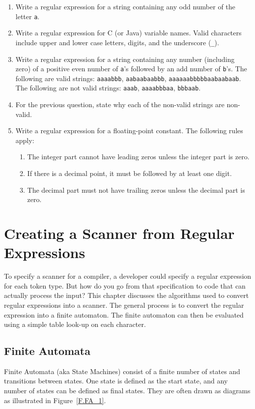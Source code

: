\documentclass[letterpaper,12pt,openany,reqno]{book}%
\begin{document}
\begin{enumerate}
\item Write a regular expression for a string containing any odd number of the letter \texttt{a}.
\item Write a regular expression for C (or Java) variable names. Valid characters include upper and lower case letters, digits, and the underscore (\texttt{\_}).
\item Write a regular expression for a string containing any number (including zero) of a positive even number of \texttt{a}'s followed by an add number of \texttt{b}'s. The following are valid strings: \texttt{aaaabbb}, \texttt{aabaabaabbb}, \texttt{aaaaaabbbbbaabaabaab}. The following are not valid strings: \texttt{aaab}, \texttt{aaaabbbaa}, \texttt{bbbaab}.
\item For the previous question, state why each of the non-valid strings are non-valid.
\item Write a regular expression for a floating-point constant. The following rules apply: 
\begin{enumerate}
\item The integer part cannot have leading zeros unless the integer part is zero. 
\item If there is a decimal point, it must be followed by at least one digit.
\item The decimal part must not have trailing zeros unless the decimal part is zero.
\end{enumerate}
\end{enumerate}

\chapter{Creating a Scanner from Regular Expressions}

To specify a scanner for a compiler, a developer could specify a regular expression for each token type. But how do you go from that specification to code that can actually process the input? This chapter discusses the algorithms used to convert regular expressions into a scanner. The general process is to convert the regular expression into a finite automaton. The finite automaton can then be evaluated using a simple table look-up on each character.

\section{Finite Automata}
Finite Automata (aka State Machines) consist of a finite number of states and transitions between states. One state is defined as the start state, and any number of states can be defined as final states. They are often drawn as diagrams as illustrated in Figure~\ref{F.FA_1}.
\end{document}

